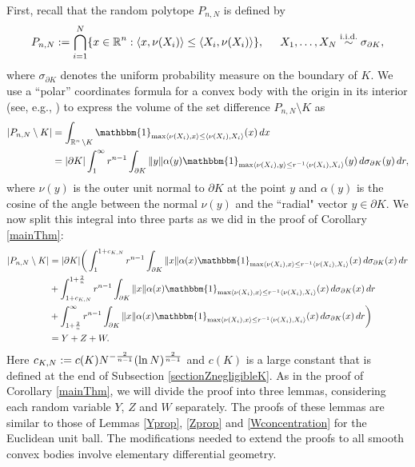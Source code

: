 First, recall that the random polytope $ P_{n,N} $ is defined by
\[
P_{n,N} := \bigcap_{i=1}^{N}\{x\in\operatorname{\mathbb{R}}^n: \langle x, \nu(X_i) \rangle \leq \langle X_i, \nu(X_i) \rangle \}, \hspace{.2in} X_1,\ldots,X_N \stackrel{\text{i.i.d.}}{\sim} \sigma_{\partial K} ,
\]
where $ \sigma_{\partial K} $ denotes the uniform probability measure on the boundary of $ K $. We use a ``polar'' coordinates formula for a convex body with the origin in its interior (see, e.g., \cite{nazarov2003maximal}) to express the volume of the set difference $P_{n,N}\setminus K$ as
\begin{align*}
|P_{n,N}\setminus K| &=\int_{\R^{n} \setminus K} \mathbbm{1}_{\max\inneri{\nu(X_i)}{x} \leq \inneri{\nu(X_i)}{X_i}}(x)\, dx\\
&= |\partial K|\int_{1}^{\infty}r^{n-1}\int_{\partial K}\|y\|\alpha(y)\mathbbm{1}_{\max\inneri{\nu(X_i)}{y}\leq r^{-1}\inneri{\nu(X_i)}{X_i}}(y) \,d\sigma_{\partial K}(y)\,dr,
\end{align*}
where  $ \nu(y) $ is the outer unit normal to $\partial K$ at the point $y$ and $ \alpha(y) $ is the cosine of  the angle between the normal $ \nu(y) $ and the ``radial" vector $ y\in\partial K.$ We now split this integral into three parts as we did in the proof of Corollary \ref{mainThm}:
\begin{align}|P_{n,N}\setminus K| & =|\partial K|\bigg(\int_{1}^{1+c_{K,N}}r^{n-1}\int_{\partial K}\|x\|\alpha(x)\mathbbm{1}_{\max\langle\nu(X_{i}),x\rangle\leq r^{-1}\langle\nu(X_{i}),X_{i}\rangle}(x)\,d\sigma_{\partial K}(x)\,dr\nonumber\\
& +\int_{1+c_{K,N}}^{1+\frac{2}{n}}r^{n-1}\int_{\partial K}\|x\|\alpha(x)\mathbbm{1}_{\max\langle\nu(X_{i}),x\rangle\leq r^{-1}\langle\nu(X_{i}),X_{i}\rangle}(x)\,d\sigma_{\partial K}(x)\,dr\nonumber\\
& +\int_{1+\frac{2}{n}}^{\infty}r^{n-1}\int_{\partial K}\|x\|\alpha(x)\mathbbm{1}_{\max\langle\nu(X_{i}),x\rangle\leq r^{-1}\langle\nu(X_{i}),X_{i}\rangle}(x)\,d\sigma_{\partial K}(x)\,dr\bigg)\nonumber\\
& =Y+Z+W.
\end{align}
Here $ c_{K,N}:=c(K)N^{-\frac 2{n-1}}(\ln N)^{\frac{2}{n-1}} $ and $ c(K) $ is a large constant that is defined at the end of Subsection \ref{sectionZnegligibleK}. As in the proof of Corollary \ref{mainThm}, we will divide the proof into three lemmas, considering each random variable $Y$, $Z$ and $W$ separately. The proofs of these lemmas are similar to those of Lemmas  \ref{Yprop}, \ref{Zprop} and \ref{Wconcentration} for the Euclidean unit ball. The modifications needed to extend the proofs to all smooth convex bodies  involve elementary differential geometry. 

